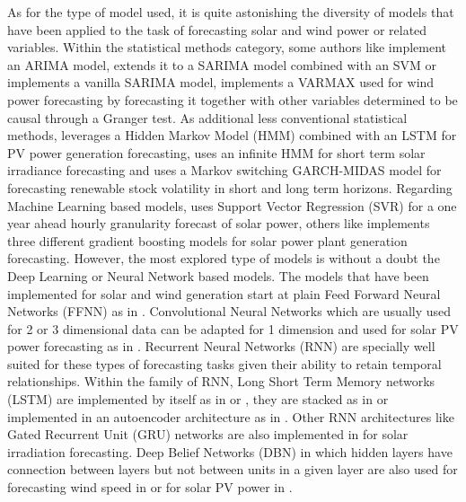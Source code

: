 As for the type of model used, it is quite astonishing the diversity of models that have been applied to the task of forecasting solar and wind power or related variables. Within the statistical methods category, some authors like \cite{pedro_coimbra_2012} implement an ARIMA model, \cite{m_bouzerdoum_mellit_pavan_2013} extends it to a SARIMA model combined with an SVM or \cite{haddad_nicod_2019} implements a vanilla SARIMA model, \cite{jain_none_behera_2022} implements a VARMAX used for wind power forecasting by forecasting it together with other variables determined to be causal through a Granger test. As additional less conventional statistical methods, \cite{delgado_estefan_neill_carrillo_andrade_2024} leverages a Hidden Markov Model (HMM) combined with an LSTM for PV power generation forecasting, \cite{frimane_munkhammar_van_meer_2022} uses an infinite HMM for short term solar irradiance forecasting and \cite{wang_wu_cao_hong_2022} uses a Markov switching GARCH-MIDAS model for forecasting renewable stock volatility in short and long term horizons. 
Regarding Machine Learning based models, \cite{abuella_chowdhury_2016} uses Support Vector Regression (SVR) for a one year ahead hourly granularity forecast of solar power, others like \cite{aksoy_istemihan_genc_2023} implements three different gradient boosting models for solar power plant generation forecasting. 
However, the most explored type of models is without a doubt the Deep Learning or Neural Network based models. The models that have been implemented for solar and wind generation start at plain Feed Forward Neural Networks (FFNN) as in \cite{pedro_coimbra_2012}. Convolutional Neural Networks which are usually used for 2 or 3 dimensional data can be adapted for 1 dimension and used for solar PV power forecasting as in \cite{huang_kuo_2019}. Recurrent Neural Networks (RNN) are specially well suited for these types of forecasting tasks given their ability to retain temporal relationships. Within the family of RNN, Long Short Term Memory networks (LSTM) are implemented by itself as in \cite{abdel_nasser_mahmoud_2017} or \cite{hossain_mahmood_2020}, they are stacked as in \cite{liang_nguyen_jin_2018} or implemented in an autoencoder architecture as in \cite{suresh_janik_guerrero_leonowicz_sikorski_2020}. Other RNN architectures like Gated Recurrent Unit (GRU) networks are also implemented in \cite{learning_2017} for solar irradiation forecasting. Deep Belief Networks (DBN) in which hidden layers have connection between layers but not between units in a given layer are also used for forecasting wind speed in \cite{lin_pai_ting_2019} or for solar PV power in \cite{neo_teo_woo_t_logenthiran_sharma_2017}. 
